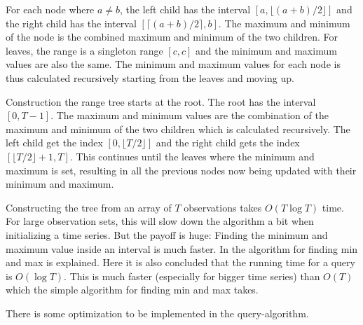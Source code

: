 For each node where $a \neq b$, the left child has the interval $[a, \lfloor
(a+b)/2 \rfloor]$ and the right child has the interval $[\lceil
(a+b)/2 \rceil, b]$. The maximum and minimum of the node is the combined maximum
and minimum of the two children. For leaves, the range is a singleton range
$[c,c]$ and the minimum and maximum values are also the same. The minimum and
maximum values for each node is thus calculated recursively starting from the
leaves and moving up. 

Construction the range tree starts at the root. The root has the interval
$[0,T-1]$. The maximum and minimum values are the combination of the maximum and
minimum of the two children which is calculated recursively. The left child get
the index $[0, \lfloor T/2 \rfloor]$ and the right child gets the index $[\lfloor
T/2 \rfloor + 1, T ]$. This
continues until the leaves where the minimum and maximum is set, resulting in
all the previous nodes now being updated with their minimum and maximum. 

Constructing the tree from an array of $T$ observations takes 
$O(T \log T)$ time. For large observation sets, this will slow down the
algorithm a bit when initializing a time series. But the payoff is huge: Finding
the minimum and maximum value inside an interval is much faster. In
\cite{compstat14} the algorithm for finding min and max is explained. Here it is
also concluded that the running time for a query is $O(\log T)$. This is much
faster (especially for bigger time series) than $O(T)$ which the simple
algorithm for finding min and max takes. 

There is some optimization to be implemented in the query-algorithm. 